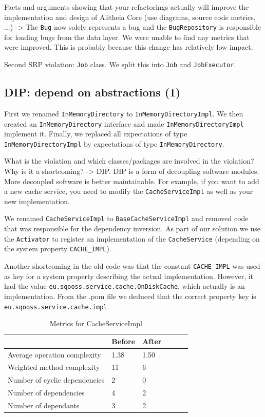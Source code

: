 \documentclass{article}
\begin{document}
Facts and arguments showing that your refactorings actually will improve the implementation and design of Alitheia Core (use diagrams, source code metrics, ...)
 -> The \verb|Bug| now solely represents a bug and the \verb|BugRepository| is responsible for loading bugs from the data layer. We were unable to find any metrics that were improved. This is probably because this change has relatively low impact.

Second SRP violation: \verb|Job| class. We split this into \verb|Job| and \verb|JobExecutor|.

\subsection{DIP: depend on abstractions (1)}
First we renamed \verb|InMemoryDirectory| to \verb|InMemoryDirectoryImpl|. We then created an \texttt{InMemoryDirectory} interface and made \verb|InMemoryDirectoryImpl| implement it. Finally, we replaced all expectations of type \verb|InMemoryDirectoryImpl| by expectations of type \verb|InMemoryDirectory|.

What is the violation and which classes/packages are involved in the violation? Why is it a shortcoming?
 -> DIP. DIP is a form of decoupling software modules. More decoupled software is better maintainable. For example, if you want to add a new cache service, you need to modify the \verb|CacheServiceImpl| as well as your new implementation.

We renamed \verb|CacheServiceImpl| to \verb|BaseCacheServiceImpl| and removed code that was responsible for the dependency inversion. As part of our solution we use the \verb|Activator| to register an implementation of the \verb|CacheService| (depending on the system property \verb|CACHE_IMPL|).

Another shortcoming in the old code was that the constant \verb|CACHE_IMPL| was used as key for a system property describing the actual implementation. However, it had the value \texttt{eu\allowbreak.sqooss.service.cache.OnDiskCache}, which actually is an implementation. From the .pom file we deduced that the correct property key is \verb|eu.sqooss.service.cache.impl|.

\begin{table}
	\centering
    \begin{tabular}{l|llll}
    ~                                 & Before & After & ~ & ~ \\ \hline
    Average operation complexity      & 1.38 & 1.50 \\
    Weighted method complexity        & 11   & 6 \\
    Number of cyclic dependencies     & 2    & 0 \\
    Number of dependencies            & 4    & 2 \\
    Number of dependants              & 3    & 2 \\
    \end{tabular}
    \caption{Metrics for CacheServiceImpl}
\end{table}
\end{document}
